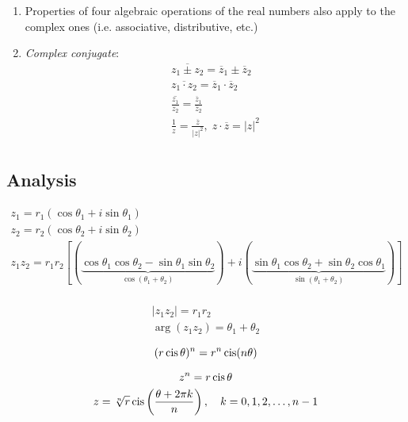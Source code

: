 \documentclass[00_complete]{subfiles}
\begin{document}
\begin{enumerate}
\item
  Properties of four algebraic operations of the real numbers also apply
  to the complex ones (i.e. associative, distributive, etc.)
\item
  \emph{Complex conjugate}: \[
  \begin{gathered}
   \overline{z_1 \pm z_2} = \overline z_1 \pm \overline z_2 \\
   \overline{z_1 \cdot z_2} = \overline z_1 \cdot \overline z_2 \\
   \overline{\frac{z_1}{z_2}} = \frac{\overline z_1}{\overline z_2} \\
   \frac{1}{z}=\frac{\overline z}{|z|^2}, \; z \cdot \overline z  = |z|^2 \\
  \end{gathered}
  \]
\end{enumerate}

\subsection{Analysis}

\[
\begin{gathered}
    z_1 = r_1(\cos \theta_1 + i \sin \theta_1) \\
    z_2 = r_2(\cos \theta_2 + i \sin \theta_2) \\
    z_1 z_2= r_1 r_2 [
        (\underbrace{\cos \theta_1 \cos \theta_2 - \sin \theta_1 \sin\theta_2}
            _{\cos (\theta_1 + \theta_2)})
        +i(\underbrace{\sin \theta_1 \cos \theta_2 + \sin \theta_2 \cos \theta_1}
            _{\sin(\theta_1 + \theta_2)})
    ] \\
\end{gathered}
\]

\begin{conclusion}
\[
\begin{gathered}
    |z_1 z_2| = r_1 r_2 \\
    \arg(z_1 z_2) = \theta_1 + \theta_2
\end{gathered}
\]
\end{conclusion}

\begin{definition}
\[
(r \operatorname{cis}\theta)^n=r^n \operatorname{cis}(n \theta)
\]
\end{definition}

\begin{definition}
\[
\begin{gathered}
    z^n = r \operatorname{cis} \theta \\
    z = \sqrt[n]{r} \operatorname{cis}\left(\frac{\theta + 2 \pi k}{n}\right),
    \quad k = 0, 1, 2, \ldots, n-1
\end{gathered}
\]
\end{definition}
\end{document}
